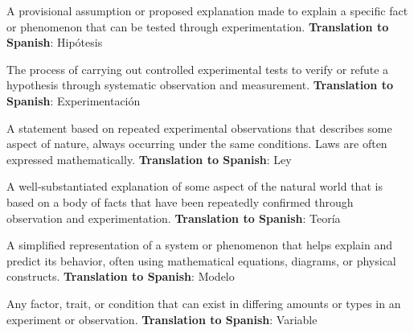 \begin{vocabulary}[Hypothesis]
A provisional assumption or proposed explanation made to explain a specific fact or phenomenon that can be tested through experimentation. \newline
\textbf{Translation to Spanish}: Hipótesis \newline
\end{vocabulary}

\begin{vocabulary}[Experimentation]
The process of carrying out controlled experimental tests to verify or refute a hypothesis through systematic observation and measurement. \newline
\textbf{Translation to Spanish}: Experimentación \newline
\end{vocabulary}

\begin{vocabulary}[Law]
A statement based on repeated experimental observations that describes some aspect of nature, always occurring under the same conditions. Laws are often expressed mathematically. \newline
\textbf{Translation to Spanish}: Ley \newline
\end{vocabulary}

\begin{vocabulary}[Theory]
A well-substantiated explanation of some aspect of the natural world that is based on a body of facts that have been repeatedly confirmed through observation and experimentation. \newline
\textbf{Translation to Spanish}: Teoría \newline
\end{vocabulary}

\begin{vocabulary}[Model]
A simplified representation of a system or phenomenon that helps explain and predict its behavior, often using mathematical equations, diagrams, or physical constructs. \newline
\textbf{Translation to Spanish}: Modelo \newline
\end{vocabulary}

\begin{vocabulary}[Variable]
Any factor, trait, or condition that can exist in differing amounts or types in an experiment or observation. \newline
\textbf{Translation to Spanish}: Variable \newline
\end{vocabulary}

